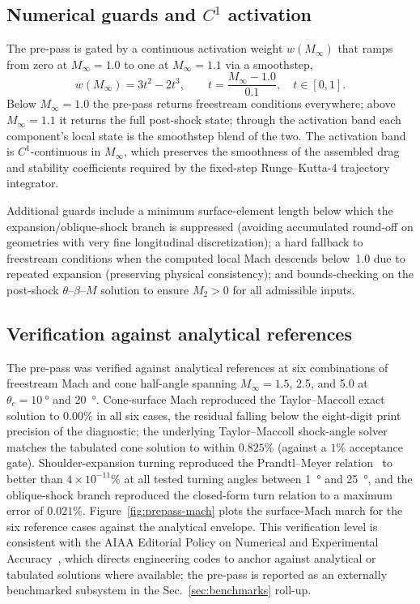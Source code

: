 \subsection{Numerical guards and $C^1$ activation}
\label{subsec:prepass-activation}

The pre-pass is gated by a continuous activation weight $w(M_\infty)$ that ramps
from zero at $M_\infty = 1.0$ to one at $M_\infty = 1.1$ via a smoothstep,
\begin{equation}
w(M_\infty) = 3t^2 - 2t^3, \qquad t = \frac{M_\infty - 1.0}{0.1},
\quad t \in [0,1].
\label{eq:smoothstep}
\end{equation}
Below $M_\infty = 1.0$ the pre-pass returns freestream conditions everywhere;
above $M_\infty = 1.1$ it returns the full post-shock state; through the
activation band each component's local state is the smoothstep blend of the two.
The activation band is $C^1$-continuous in $M_\infty$, which preserves the
smoothness of the assembled drag and stability coefficients required by the
fixed-step Runge--Kutta-4 trajectory integrator.

Additional guards include a minimum surface-element length below which the
expansion/oblique-shock branch is suppressed (avoiding accumulated round-off on
geometries with very fine longitudinal discretization); a hard fallback to
freestream conditions when the computed local Mach descends below~1.0 due to
repeated expansion (preserving physical consistency); and bounds-checking on the
post-shock $\theta$--$\beta$--$M$ solution to ensure $M_2 > 0$ for all admissible
inputs.

\subsection{Verification against analytical references}
\label{subsec:prepass-verification}

The pre-pass was verified against analytical references at six combinations of
freestream Mach and cone half-angle spanning $M_\infty = 1.5$, 2.5, and 5.0 at
$\theta_c = \SI{10}{\degree}$ and \SI{20}{\degree}. Cone-surface Mach reproduced
the Taylor--Maccoll exact solution to $0.00\%$ in all six cases, the residual
falling below the eight-digit print precision of the diagnostic; the underlying
Taylor--Maccoll shock-angle solver matches the tabulated cone solution to within
$0.825\%$ (against a $1\%$ acceptance gate). Shoulder-expansion turning
reproduced the Prandtl--Meyer relation~\cite{naca1135} to better than
$4 \times 10^{-11}\%$ at all tested turning angles between \SI{1}{\degree} and
\SI{25}{\degree}, and the oblique-shock branch reproduced the closed-form turn
relation to a maximum error of $0.021\%$. Figure~\ref{fig:prepass-mach} plots the
surface-Mach march for the six reference cases against the analytical envelope.
This verification level is consistent with the AIAA Editorial Policy on Numerical
and Experimental Accuracy~\cite{aiaa_numerical_policy}, which directs engineering
codes to anchor against analytical or tabulated solutions where available; the
pre-pass is reported as an externally benchmarked subsystem in the Sec.~\ref{sec:benchmarks}
roll-up.

